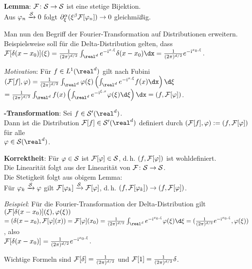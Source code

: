 \textbf{Lemma}: $\F\colon \S \rightarrow \S$ ist eine stetige Bijektion.\\
Aus $\varphi_n \xrightarrow{\S} 0$ folgt
$\partial^\alpha_\xi (\xi^\beta \F[\varphi_n]) \to 0$ gleichmäßig.

Man nun den Begriff der Fourier-Transformation auf Distributionen erweitern.\\
Beispielsweise soll für die Delta-Distribution gelten, dass\\
$\F[\delta(x - x_0)](\xi) = \frac{1}{(2\pi)^{d/2}}
\int_{\real^d} e^{-\i\sp{x, \xi}}\delta(x - x_0)\dx =
\frac{1}{(2\pi)^{d/2}} e^{-\i\sp{x_0, \xi}}$.

\linie

\emph{Motivation}:
Für $f \in L^1(\real^d)$ gilt nach Fubini
$(\F[f], \varphi) = \frac{1}{(2\pi)^{d/2}} \int_{\real^d} \varphi(\xi)
\left(\int_{\real^d} e^{-\i\sp{x, \xi}}f(x)\dx\right) \d\xi$\\
$= \frac{1}{(2\pi)^{d/2}} \int_{\real^d} f(x)
\left(\int_{\real^d} e^{-\i\sp{\xi, x}}\varphi(\xi)\d\xi\right) \dx =
(f, \F[\varphi])$.

\textbf{-Transformation}:
Sei $f \in \S'(\real^d)$.\\
Dann ist die Distribution $\F[f] \in \S'(\real^d)$ definiert durch
$(\F[f], \varphi) := (f, \F[\varphi])$ für alle\\
$\varphi \in \S(\real^d)$.

\textbf{Korrektheit}:
Für $\varphi \in \S$ ist $\F[\varphi] \in \S$, d.\,h.
$(f, \F[\varphi])$ ist wohldefiniert.\\
Die Linearität folgt aus der Linearität von $\F\colon \S \rightarrow \S$.\\
Die Stetigkeit folgt aus obigem Lemma:\\
Für $\varphi_k \xrightarrow{\S} \varphi$ gilt
$\F[\varphi_k] \xrightarrow{\S} \F[\varphi]$, d.\,h.
$(f, \F[\varphi_k]) \to (f, \F[\varphi])$.

\emph{Beispiel}:
Für die Fourier-Transformation der Delta-Distribution gilt
$(\F[\delta(x - x_0)](\xi), \varphi(\xi))$\\
$= (\delta(x - x_0), \F[\varphi](x)) = \F[\varphi](x_0) =
\frac{1}{(2\pi)^{d/2}} \int_{\real^d} e^{-\i\sp{x_0, \xi}}\varphi(\xi)\d\xi =
(\frac{1}{(2\pi)^{d/2}} e^{-\i\sp{x_0, \xi}}, \varphi(\xi))$, also\\
$\F[\delta(x - x_0)] = \frac{1}{(2\pi)^{d/2}} e^{-\i\sp{x_0, \xi}}$.

Wichtige Formeln sind $\F[\delta] = \frac{1}{(2\pi)^{d/2}}$ und
$\F[1] = \frac{1}{(2\pi)^{d/2}} \delta$.

